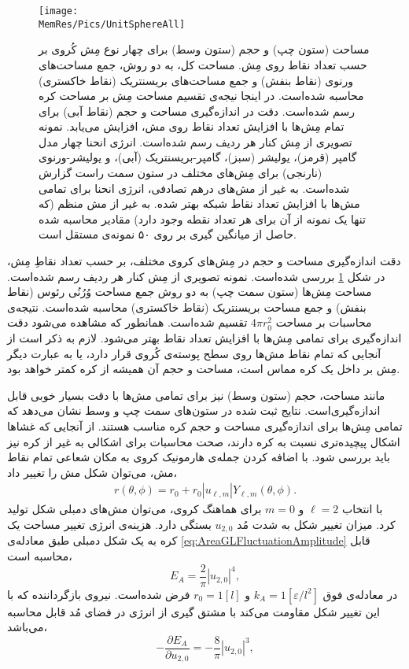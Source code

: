 \begin{figure}[tbp]
\begin{center}
\texttt{[image: \\MemRes/Pics/UnitSphereAll]}
\caption{
مساحت (ستون چپ) و حجم (ستون وسط) برای چهار نوع مِش کُروی بر حسب تعداد نقاط روی مِش. مساحت کل، به دو روش، جمع مساحت‌های ورنوی (نقاط بنفش) و جمع مساحت‌های بریسنتریک (نقاط خاکستری) محاسبه شده‌است. در اینجا نیجه‌ی تقسیم مساحت مِش‌ بر مساحت کره رسم شده‌است. دقت در اندازه‌گیری مساحت و حجم (نقاط آبی) برای تمام مِش‌ها با افزایش تعداد نقاط روی مش، افزایش می‌یابد. نمونه تصویری از مِش کنار هر ردیف رسم شده‌است. انرژی انحنا چهار مدل گامپر (قرمز)، یولیشر (سبز)، گامپر-بریسنتریک (آبی)، و یولیشر-ورنوی (نارنجی) برای مِش‌های مختلف در ستون سمت راست گزارش شده‌است. به غیر از مش‌های درهم تصادفی، انرژی انحنا برای تمامی مش‌ها با افزایش تعداد نقاط شبکه بهتر شده. به غیر از مش منظم (که تنها یک نمونه از آن برای هر تعداد نقطه وجود دارد) مقادیر محاسبه شده حاصل از میانگین گیری بر روی ۵۰ نمونه‌ی مستقل است.
}
\label{fig:unitsphereAll}
\end{center}
\end{figure}

دقت اندازه‌گیری مساحت و حجم در مِش‌های کروی مختلف، بر حسب تعداد نقاطِ مِش، در شکل
\ref{fig:unitsphereAll}
بررسی شده‌است. نمونه تصویری از مِش کنار هر ردیف رسم شده‌است. مساحت مِش‌ها (ستون سمت چپ) به دو روش جمع  مساحت‌ وُرُنُی رئوس (نقاط بنفش) و جمع مساحت بریسنتریک (نقاط خاکستری) محاسبه شده‌است. نتیجه‌ی محاسبات بر مساحت 
$4\pi r_0^2$
 تقسیم شده‌است. همانطور که مشاهده می‌شود دقت اندازه‌گیری برای تمامی مِش‌ها با افزایش تعداد نقاط بهتر می‌شود. لازم به ذکر است  از آنجایی که تمام نقاط مش‌ها روی سطح پوسته‌ی کُروی قرار دارد، یا به عبارت دیگر مِش بر داخل یک کره‌ مماس است، مساحت و حجم آن همیشه از کره کمتر خواهد بود.




مانند مساحت، حجم (ستون وسط) نیز برای تمامی مش‌ها با دقت بسیار خوبی قابل اندازه‌گیری‌است. نتایج ثبت شده در ستون‌های سمت چپ و وسط نشان‌ می‌دهد که تمامی‌ مِش‌ها برای اندازه‌گیری مساحت و حجم کره مناسب هستند. از آنجایی که غشا‌ها اشکال پیچیده‌تری نسبت به کره دارند، صحت محاسبات برای اشکالی به غیر از کره نیز باید بررسی شود. با اضافه کردن جمله‌ی هارمونیک کروی به مکان شعاعی تمام نقاط مش، می‌توان شکل مش را تغییر داد،
\begin{eqnarray}
r(\theta,\phi)=r_0+r_0|u_{\ell,m}|Y_{\ell,m}(\theta,\phi).
\label{eq:rDeformed}
\end{eqnarray}
با انتخاب
$\ell=2$
و
$m=0$
برای هماهنگ‌ کروی، می‌توان مش‌های دمبلی شکل  تولید کرد. میزان تغییر شکل به شدت مُد
$u_{2,0}$
بستگی دارد. هزینه‌ی انرژی تغییر مساحت یک کره به یک شکل دمبلی طبق معادله‌ی
\ref{eq:AreaGLFluctuationAmplitude}
قابل محاسبه ‌است،
\begin{equation}
E_A=\frac{2}{\pi}|u_{2,0}|^4,
\label{eq:AreaEnergyULM20}
\end{equation}
در معادله‌ی فوق 
$k_A=1[\varepsilon/l^2]$
و
$r_0=1[l]$
فرض شده‌است. نیروی بازگرداننده که با این تغییر شکل مقاومت می‌کند با مشتق گیری از انرژی در فضای مُد قابل محاسبه‌ می‌باشد، 
\begin{equation}
-\frac{\partial E_A}{\partial u_{2,0}}=-\frac{8}{\pi}|u_{2,0}|^3,
\label{eq:AreaForceULM20}
\end{equation}


